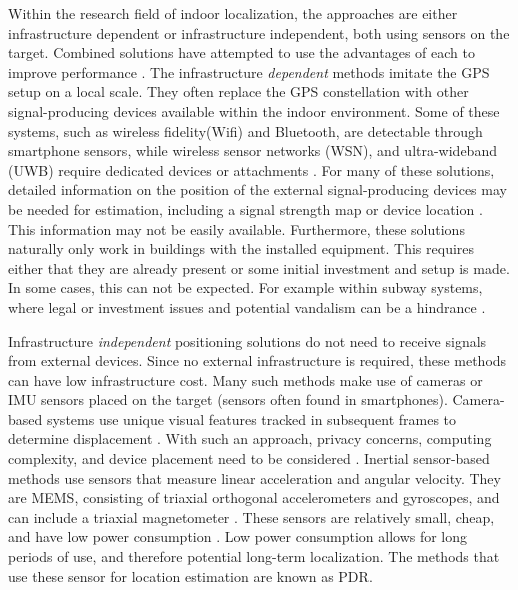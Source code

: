 Within the research field of indoor localization, the approaches are either infrastructure dependent or infrastructure independent, both using sensors on the target. Combined solutions have attempted to use the advantages of each to improve performance \cite{Gu2019, Correa2017}. The infrastructure \textit{dependent} methods imitate the GPS setup on a local scale. They often replace the GPS constellation with other signal-producing devices available within the indoor environment. Some of these systems, such as wireless fidelity(Wifi) and Bluetooth, are detectable through smartphone sensors, while wireless sensor networks (WSN), and ultra-wideband (UWB) require dedicated devices or attachments \cite{Wu2019,Jackermeier2018,Davidson2017}. For many of these solutions, detailed information on the position of the external signal-producing devices may be needed for estimation, including a signal strength map or device location \cite{Jackermeier2018,Shang2015}. This information may not be easily available. Furthermore, these solutions naturally only work in buildings with the installed equipment. This requires either that they are already present or some initial investment and setup is made. In some cases, this can not be expected. For example within subway systems, where legal or investment issues and potential vandalism can be a hindrance \cite{Torok2014}. \par
%

Infrastructure \textit{independent} positioning solutions do not need to receive signals from external devices. Since no external infrastructure is required, these methods can have low infrastructure cost. Many such methods make use of cameras or \ac{IMU} sensors placed on the target (sensors often found in smartphones). Camera-based systems use unique visual features tracked in subsequent frames to determine displacement \cite{Gu2019}. With such an approach, privacy concerns, computing complexity, and device placement need to be considered \cite{Gu2019}. Inertial sensor-based methods use sensors that measure linear acceleration and angular velocity. They are \ac{MEMS},  consisting of triaxial orthogonal accelerometers and gyroscopes, and can include a triaxial magnetometer \cite{Yang2014}. These sensors are relatively small, cheap, and have low power consumption \cite{Olsson2016}. Low power consumption allows for long periods of use, and therefore potential long-term localization. The methods that use these sensor for location estimation are known as \ac{PDR}. \par

